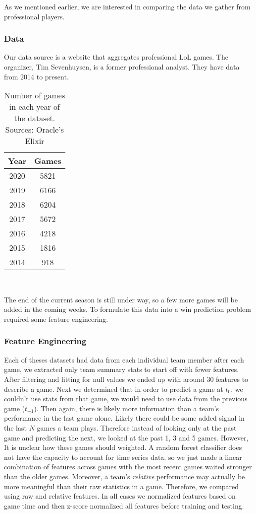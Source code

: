 \documentclass{article}
\begin{document}
As we mentioned earlier, we are interested in comparing the data we gather from professional players.
\subsubsection{Data}
Our data source is a website that aggregates professional LoL games. The organizer, Tim Sevenhuysen, is a former professional analyst.
They have data from 2014 to present. 

\begin{table}[h!]
    \begin{centering}
    \begin{tabular}{|c|c|} \hline
        Year & Games \\ \hline
        2020 & 5821  \\ \hline
        2019 & 6166 \\ \hline
        2018 & 6204 \\ \hline
        2017 & 5672 \\ \hline
        2016 & 4218 \\ \hline
        2015 & 1816 \\ \hline
        2014 & 918 \\ \hline
    \end{tabular} \\[10pt]
    \caption{Number of games in each year of the dataset. Sources: Oracle's Elixir}
    \end{centering}
\end{table}

The end of the current season is still under way, so a few more games will be added in the coming weeks. 
To formulate this data into a win prediction problem required some feature engineering.

\subsubsection{Feature Engineering}
Each of theses datasets had data from each individual team member after each game, we extracted only team summary stats to start off with fewer features.
After filtering and fitting for null values we ended up with around 30 features to describe a game. 
Next we determined that in order to predict a game at $t_0$, we couldn't use stats from that game, we would need to use data from the previous game ($t_{-1}$). 
Then again, there is likely more information than a team's performance in the last game alone.
Likely there could be some added signal in the last $N$ games a team plays. 
Therefore instead of looking only at the past game and predicting the next, we looked at the past 1, 3 and 5 games. 
However, It is unclear how these games should weighted. 
A random forest classifier does not have the capacity to account for time series data, so we just made a linear combination of features across games with the most recent games waited stronger than the older games. 
Moreover, a team's \emph{relative} performance may actually be more meaningful than their raw statistics in a game. 
Therefore, we compared using raw and relative features. 
In all cases we normalized features based on game time and then z-score normalized all features before training and testing. 
\end{document}
